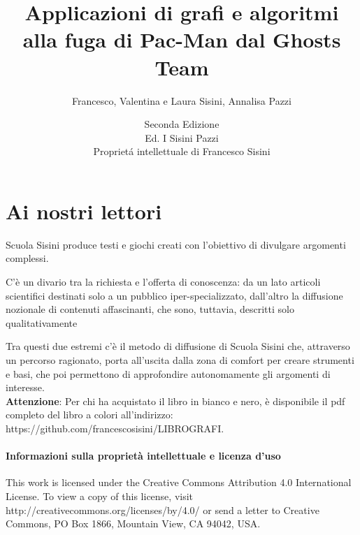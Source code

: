\documentclass[8pt]{book}
\title{Applicazioni di grafi e algoritmi alla fuga di Pac-Man dal Ghosts Team}
\author{Francesco, Valentina e Laura Sisini, Annalisa Pazzi}
\date{Seconda Edizione\\Ed. I Sisini Pazzi\\Propriet\'a intellettuale di Francesco Sisini}
\begin{document}
              
              \mbox{}
              \thispagestyle{empty}
              \newpage
              
            \mbox{}
            \thispagestyle{empty}
            \newpage
            
            \maketitle
            
            
            \thispagestyle{empty}
            \clearpage
\tableofcontents


\clearpage

\section*{Ai nostri lettori}

Scuola Sisini produce testi e giochi creati con l'obiettivo di divulgare argomenti complessi.

C'è un divario tra la richiesta e l'offerta di conoscenza: da un lato articoli scientifici destinati solo a un pubblico iper-specializzato, dall'altro la diffusione nozionale di contenuti affascinanti, che sono, tuttavia, descritti solo qualitativamente

Tra questi due estremi c'è il metodo di diffusione di Scuola Sisini che, attraverso un percorso ragionato, porta all'uscita dalla zona di comfort per creare strumenti e basi, che poi permettono di approfondire autonomamente gli argomenti di interesse.\\

\textbf{Attenzione}: Per chi ha acquistato il libro in bianco e nero, è disponibile il pdf completo del libro a colori all'indirizzo: https://github.com/francescosisini/LIBROGRAFI.\\

\paragraph{Informazioni sulla proprietà intellettuale e licenza d'uso}\label{tocux5f3}

This work is licensed under the Creative Commons Attribution 4.0 International License. To view a copy of this license, visit http://creativecommons.org/licenses/by/4.0/ or send a letter to Creative Commons, PO Box 1866, Mountain View, CA 94042, USA.
\end{document}
